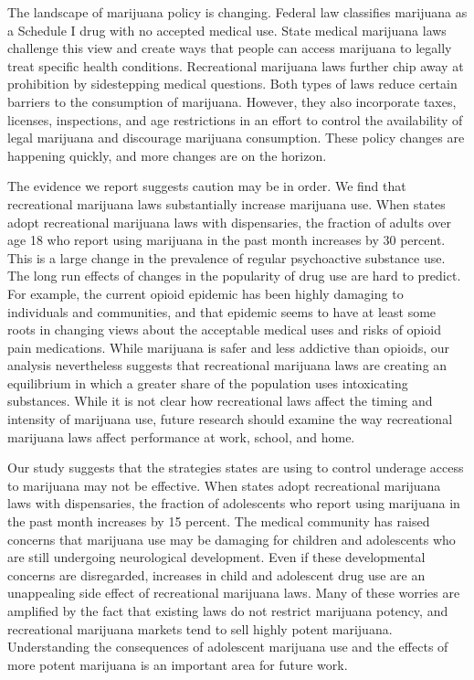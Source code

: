 \documentclass[12pt]{article}%
\begin{document}
The landscape of marijuana policy is changing. Federal law classifies marijuana as a Schedule I drug with no accepted medical use. State medical marijuana laws challenge this view and create ways that people can access marijuana to legally treat specific health conditions. Recreational marijuana laws further chip away at prohibition by sidestepping medical questions. Both types of laws reduce certain barriers to the consumption of marijuana. However, they also incorporate taxes, licenses, inspections, and age restrictions in an effort to control the availability of legal marijuana and discourage marijuana consumption. These policy changes are happening quickly, and more changes are on the horizon.

The evidence we report suggests caution may be in order. We find that recreational marijuana laws substantially increase marijuana use. When states adopt recreational marijuana laws with dispensaries, the fraction of adults over age 18 who report using marijuana in the past month increases by 30 percent. 
This is a large change in the prevalence of regular psychoactive substance use. The long run effects of changes in the popularity of drug use are hard to predict. 
For example, the current opioid epidemic has been highly damaging to individuals and communities, and that epidemic seems to have at least some roots in changing views about the acceptable medical uses and risks of opioid pain medications. 
While marijuana is safer and less addictive than opioids, our analysis nevertheless suggests that recreational marijuana laws are creating an equilibrium in which a greater share of the population uses intoxicating substances.  
While it is not clear how recreational laws affect  the timing and intensity of marijuana use,
future research should examine the way recreational marijuana laws affect performance at work, school, and home.

Our study suggests that the strategies states are using to control underage access to marijuana may not be effective. When states adopt recreational marijuana laws with dispensaries, the fraction of adolescents who report using marijuana in the past month increases by 15 percent. The medical community has raised concerns that marijuana use may be damaging for children and adolescents who are still undergoing neurological development. Even if these developmental concerns are disregarded, increases in child and adolescent drug use are an unappealing side effect of recreational marijuana laws. Many of these worries are amplified by the fact that existing laws do not restrict marijuana potency, and recreational marijuana markets tend to sell highly potent marijuana. Understanding the consequences of adolescent marijuana use and the effects of more potent marijuana is an important area for future work.
\end{document}
